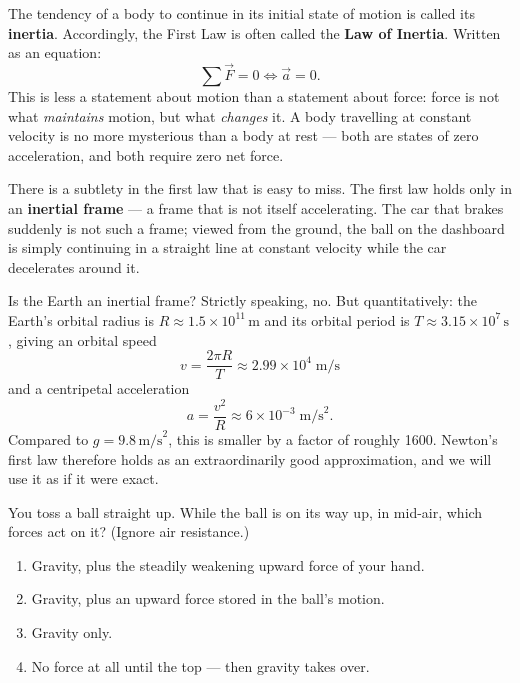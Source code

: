 The tendency of a body to continue in its initial state of motion is called its \textbf{inertia}.
Accordingly, the First Law is often called the \textbf{Law of Inertia}. Written as an equation:
\begin{equation}
  \sum\vec{F} = 0 \iff \vec{a} = 0.
\end{equation}
This is less a statement about motion than a statement about force: force is not what
\emph{maintains} motion, but what \emph{changes} it. A body travelling at constant velocity is no
more mysterious than a body at rest --- both are states of zero acceleration, and both require
zero net force.

There is a subtlety in the first law that is easy to miss. The first law holds only in an
\textbf{inertial frame} --- a frame that is not itself accelerating. The car that brakes
suddenly is not such a frame; viewed from the ground, the ball on the dashboard is simply
continuing in a straight line at constant velocity while the car decelerates around it.

Is the Earth an inertial frame? Strictly speaking, no. But quantitatively: the Earth's
orbital radius is $R\approx1.5\times10^{11}\,\text{m}$ and its orbital period is
$T\approx3.15\times10^7\,\text{s}$, giving an orbital speed
\begin{equation}
  v = \frac{2\pi R}{T} \approx 2.99\times10^4\;\text{m/s}
\end{equation}
and a centripetal acceleration
\begin{equation}
  a = \frac{v^2}{R} \approx 6\times10^{-3}\;\text{m/s}^2.
\end{equation}
Compared to $g=9.8\,\text{m/s}^2$, this is smaller by a factor of roughly 1600. Newton's
first law therefore holds as an extraordinarily good approximation, and we will use it as if
it were exact.

\begin{checkpoint}
You toss a ball straight up. While the ball is on its way up, in mid-air,
which forces act on it? (Ignore air resistance.)
\begin{enumerate}[label=(\alph*), leftmargin=2.5em, itemsep=0pt]
  \item Gravity, plus the steadily weakening upward force of your hand.
  \item Gravity, plus an upward force stored in the ball's motion.
  \item Gravity only.
  \item No force at all until the top --- then gravity takes over.
\end{enumerate}
\end{checkpoint}


